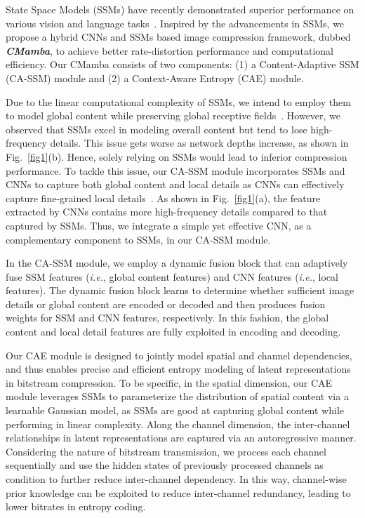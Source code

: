State Space Models (SSMs) have recently demonstrated superior performance on various vision and language tasks~\cite{gu2023mamba, zhu2024vision, liu2024vmamba}.
Inspired by the advancements in SSMs, we propose a hybrid CNNs and SSMs based image compression framework, dubbed \textbf{\textit{CMamba}}, to achieve better rate-distortion performance and computational efficiency.
Our CMamba consists of two components: (1) a Content-Adaptive SSM (CA-SSM) module and (2) a Context-Aware Entropy (CAE) module.


Due to the linear computational complexity of SSMs, we intend to employ them to model global content while preserving global receptive fields~\cite{liu2024vmamba}.
However, we observed that SSMs excel in modeling overall content but tend to lose high-frequency details. 
This issue gets worse as network depths increase, as shown in Fig.~\ref{fig1}(b).
Hence, solely relying on SSMs would lead to inferior compression performance.
To tackle this issue, our CA-SSM module incorporates SSMs and CNNs to capture both global content and local details as CNNs can effectively capture fine-grained local details~\cite{park2021vision,zou2022devil,liu2023learned}.
As shown in Fig.~\ref{fig1}(a), the feature extracted by CNNs contains more high-frequency details compared to that captured by SSMs.
Thus, we integrate a simple yet effective CNN, as a complementary component to SSMs, in our CA-SSM module. 


In the CA-SSM module, we employ a dynamic fusion block that can adaptively fuse SSM features (\emph{i.e.}, global content features) and CNN features (\emph{i.e.}, local features). 
The dynamic fusion block learns to determine whether sufficient image details or global content are encoded or decoded and then produces fusion weights for SSM and CNN features, respectively. 
In this fashion, the global content and local detail features are fully exploited in encoding and decoding. 


Our CAE module is designed to jointly model spatial and channel dependencies, and thus enables precise and efficient entropy modeling of latent representations in bitstream compression.
To be specific, in the spatial dimension, our CAE module leverages SSMs to parameterize the distribution of spatial content via a learnable Gaussian model, as SSMs are good at capturing global content while performing in linear complexity. 
Along the channel dimension, the inter-channel relationships in latent representations are captured via an autoregressive manner.
Considering the nature of bitstream transmission, we process each channel sequentially and use the hidden states of previously processed channels as condition to further reduce inter-channel dependency. 
In this way, channel-wise prior knowledge can be exploited to reduce inter-channel redundancy, leading to lower bitrates in entropy coding.



